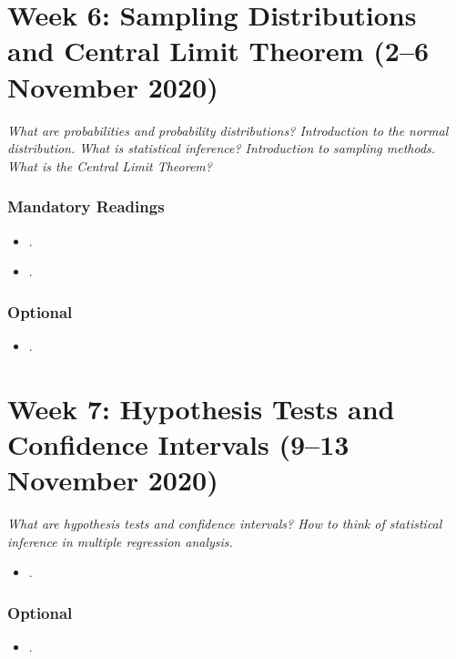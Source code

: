 \documentclass[abstract=on,parskip=full,headings=standardclasses,fontsize=11pt,paper=a4]{scrartcl}
\begin{document}
\section{Week 6:  Sampling Distributions and Central Limit Theorem (2--6 November 2020)}


\textit{What are probabilities and probability distributions? Introduction to the normal distribution. What is statistical inference? Introduction to sampling methods. What is the Central Limit Theorem?}


\subsubsection*{Mandatory Readings}
\begin{itemize}
\item {}.
\item {}.
\end{itemize}



\subsubsection*{Optional}
\begin{itemize}
\item {}.
\end{itemize}




\section{Week 7:  Hypothesis Tests and Confidence Intervals (9--13 November 2020)}


\textit{What are hypothesis tests and confidence intervals? How to think of statistical inference in multiple regression analysis.}


\begin{itemize}
\item {}.
\end{itemize}


\subsubsection*{Optional}
\begin{itemize}
\item {}.
\end{itemize}
\end{document}
